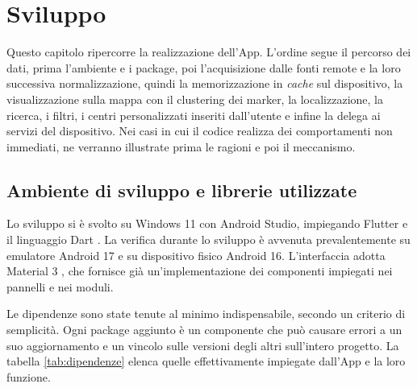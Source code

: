 \chapter{Sviluppo}\label{ch:sviluppo}

Questo capitolo ripercorre la realizzazione dell'App.
L'ordine segue il percorso dei dati, prima l'ambiente e i package, poi l'acquisizione dalle fonti remote e la loro
successiva normalizzazione, quindi la memorizzazione in \textit{cache} sul dispositivo, la visualizzazione sulla mappa con il
clustering dei marker, la localizzazione, la ricerca, i filtri, i centri personalizzati inseriti dall'utente e infine
la delega ai servizi del dispositivo.
Nei casi in cui il codice realizza dei comportamenti non immediati, ne verranno illustrate prima le ragioni e poi il meccanismo.

\section{Ambiente di sviluppo e librerie utilizzate}\label{sec:ambiente-sviluppo}

Lo sviluppo si è svolto su Windows 11 con Android Studio, impiegando Flutter e il linguaggio Dart \cite{flutterDocs, dartLang}.
La verifica durante lo sviluppo è avvenuta prevalentemente su emulatore Android 17 e su dispositivo fisico Android 16. %
L'interfaccia adotta Material 3 \cite{material3}, che fornisce già un'implementazione dei componenti impiegati nei pannelli e nei moduli.

Le dipendenze sono state tenute al minimo indispensabile, secondo un criterio di semplicità.
Ogni package aggiunto è un componente che può causare errori a un suo aggiornamento e un vincolo sulle versioni degli altri
sull'intero progetto.
La tabella \ref{tab:dipendenze} elenca quelle effettivamente impiegate dall'App e la loro funzione.

